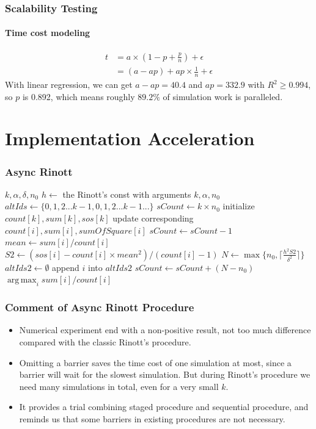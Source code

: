 \documentclass{beamer}
\DeclareMathOperator*{\argmax}{arg\,max}
\begin{document}
\begin{frame}
\frametitle{Scalability Testing}
\framesubtitle{Time cost modeling}
\begin{align*}
t & = a \times (1 - p + \frac{p}{n}) + \epsilon \\
& = (a - ap) + ap \times \frac{1}{n} + \epsilon
\end{align*}
With linear regression, we can get $a - ap = 40.4$ and $ap = 332.9$ with $R^2 \geqslant 0.994$, so $p$ is 0.892, which means roughly $89.2\%$ of simulation work is paralleled.
\end{frame}

\section{Implementation Acceleration}

\begin{frame}
\frametitle{Async Rinott}
\tiny
{
\begin{algorithmic}[1]
\Require $k, \alpha, \delta, n_0$
\State $h \gets$ the Rinott's const with arguments $k, \alpha, n_0$
\State $altIds \gets \{0, 1, 2...k - 1, 0, 1, 2...k - 1...\}$ 
\State $sCount \gets k \times n_0$ 
\State initialize $count[k], sum[k], sos[k]$ 
  \State update corresponding $count[i], sum[i], sumOfSquare[i]$
  \State $sCount \gets sCount - 1$
	\State $mean \gets sum[i] / count[i]$
	\State $S2 \gets (sos[i] - count[i] \times mean^2) / (count[i] - 1)$
	\State $N \gets \max\{n_0, \lceil \frac{h^2S2}{\delta^2} \rceil\}$
	  \State $altIds2 \gets \emptyset$
        \State append $i$ into $altIds2$
      \EndFor
	  \State $sCount \gets sCount + (N - n_0)$
	\EndIf
  \EndIf
\EndWhile
\State \Return $\argmax_{i} sum[i] / count[i]$
\end{algorithmic}
}
\end{frame}

\begin{frame}
\frametitle{Comment of Async Rinott Procedure}
\begin{itemize}
\item Numerical experiment end with a non-positive result, not too much difference compared with the classic Rinott's procedure.
\vspace{\baselineskip}
\item Omitting a barrier saves the time cost of one simulation at most, since a barrier will wait for the slowest simulation. But during Rinott's procedure we need many simulations in total, even for a very small $k$.
\vspace{\baselineskip}
\item It provides a trial combining staged procedure and sequential procedure, and reminds us that some barriers in existing procedures are not necessary.
\end{itemize}
\end{frame}
\end{document}

